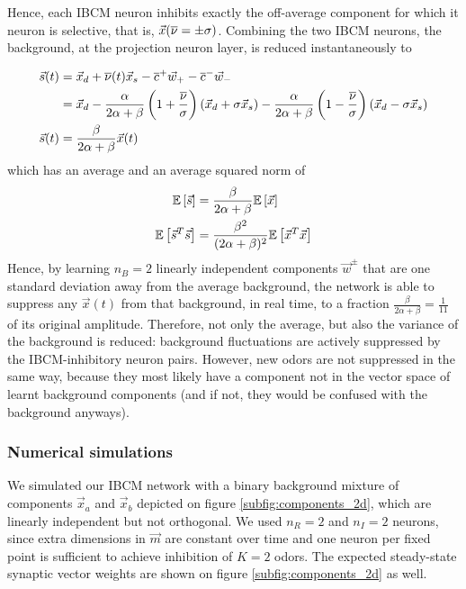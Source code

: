 Hence, each IBCM neuron inhibits exactly the off-average component for which it neuron is selective, that is, $\vec{x}(\overline{\nu} = \pm \sigma)$. Combining the two IBCM neurons, the background, at the projection neuron layer, is reduced instantaneously to

\begin{align}
	\vec{s}(t)&= \vec{x}_d + \overline{\nu}(t) \vec{x}_s - \overline{c}^+ \vec{w}_+ - \overline{c}^- \vec{w}_- \nonumber \\
			&= \vec{x}_d - \frac{\alpha}{2\alpha + \beta} \left(1 + \frac{\overline{\nu}}{\sigma} \right) \left( \vec{x}_d + \sigma \vec{x}_s \right) - \frac{\alpha}{2\alpha + \beta} \left(1 - \frac{\overline{\nu}}{\sigma} \right) \left( \vec{x}_d - \sigma \vec{x}_s \right)   \nonumber \\
	\vec{s}(t) &= \frac{\beta}{2 \alpha + \beta} \vec{x}(t)
		\label{eq:inhibition_pn_2d}
\end{align}
which has an average and an average squared norm of
\begin{align*}
	\mathbb{E}\left[ \vec{s} \right]&= \frac{\beta}{2 \alpha + \beta} \mathbb{E}\left[ \vec{x} \right] \\
	\mathbb{E}\left[ \vec{s}^T \vec{s} \right] &= \frac{\beta^2}{(2\alpha + \beta)^2} \mathbb{E}\left[ \vec{x}^T \vec{x} \right]
\end{align*}
Hence, by learning $n_B=2$ linearly independent components $\vec{w}^{\pm}$ that are one standard deviation away from the average background, the network is able to suppress any $\vec{x}(t)$ from that background, in real time, to a fraction $\frac{\beta}{2\alpha + \beta} = \frac{1}{11}$ of its original amplitude. Therefore, not only the average, but also the variance of the background is reduced: background fluctuations are actively suppressed by the IBCM-inhibitory neuron pairs. However, new odors are not suppressed in the same way, because they most likely have a component not in the vector space of learnt background components (and if not, they would be confused with the background anyways). 


\subsubsection{Numerical simulations}
\label{subsubsect:2d_model_simulations}

We simulated our IBCM network with a binary background mixture of components $\vec{x}_a$ and $\vec{x}_b$ depicted on figure \ref{subfig:components_2d}, which are linearly independent but not orthogonal. We used $n_R=2$ and $n_I=2$ neurons, since extra dimensions in $\vec{m}$ are constant over time and one neuron per fixed point is sufficient to achieve inhibition of $K=2$ odors. The expected steady-state synaptic vector weights are shown on figure \ref{subfig:components_2d} as well. 

